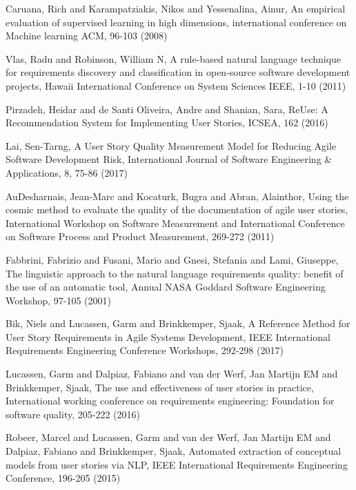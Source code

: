 \begin{thebibliography}{}
Caruana, Rich and Karampatziakis, Nikos and Yessenalina, Ainur, An empirical evaluation of supervised learning in high dimensions, international conference on Machine learning ACM, 96-103 (2008)

Vlas, Radu and Robinson, William N, A rule-based natural language technique for requirements discovery and classification in open-source software development projects, Hawaii International Conference on System Sciences IEEE, 1-10 (2011)

Pirzadeh, Heidar and de Santi Oliveira, Andre and Shanian, Sara, ReUse: A Recommendation System for Implementing User Stories, ICSEA, 162 (2016)

Lai, Sen-Tarng, A User Story Quality Measurement Model for Reducing Agile Software Development Risk, International Journal of Software Engineering \& Applications, 8, 75-86 (2017)

AuDesharnais, Jean-Marc and Kocaturk, Bugra and Abran, Alainthor, Using the cosmic method to evaluate the quality of the documentation of agile user stories, International Workshop on Software Measurement and International Conference on Software Process and Product Measurement, 269-272 (2011)

Fabbrini, Fabrizio and Fusani, Mario and Gnesi, Stefania and Lami, Giuseppe, The linguistic approach to the natural language requirements quality: benefit of the use of an automatic tool, Annual NASA Goddard Software Engineering Workshop, 97-105 (2001)

Bik, Niels and Lucassen, Garm and Brinkkemper, Sjaak, A Reference Method for User Story Requirements in Agile Systems Development, IEEE International Requirements Engineering Conference Workshops, 292-298 (2017)

Lucassen, Garm and Dalpiaz, Fabiano and van der Werf, Jan Martijn EM and Brinkkemper, Sjaak, The use and effectiveness of user stories in practice, International working conference on requirements engineering: Foundation for software quality, 205-222 (2016)

Robeer, Marcel and Lucassen, Garm and van der Werf, Jan Martijn EM and Dalpiaz, Fabiano and Brinkkemper, Sjaak, Automated extraction of conceptual models from user stories via NLP, IEEE International Requirements Engineering Conference, 196-205 (2015)


\end{thebibliography}
